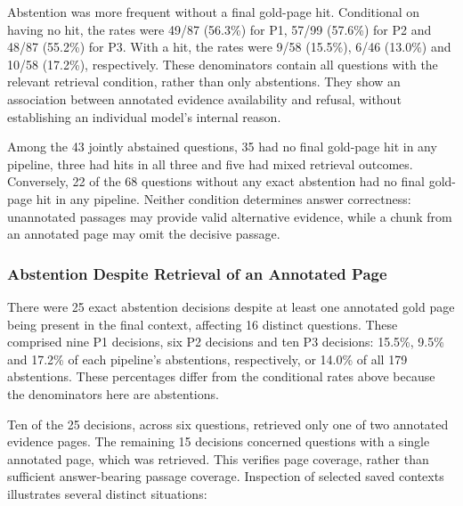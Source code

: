 Abstention was more frequent without a final gold-page hit. Conditional on
having no hit, the rates were 49/87 (56.3\%) for P1, 57/99 (57.6\%) for P2
and 48/87 (55.2\%) for P3. With a hit, the rates were 9/58 (15.5\%),
6/46 (13.0\%) and 10/58 (17.2\%), respectively. These denominators contain
all questions with the relevant retrieval condition, rather than only
abstentions. They show an association between annotated evidence availability
and refusal, without establishing an individual model's internal reason.

Among the 43 jointly abstained questions, 35 had no final gold-page hit in
any pipeline, three had hits in all three and five had mixed retrieval
outcomes. Conversely, 22 of the 68 questions without any exact abstention
had no final gold-page hit in any pipeline. Neither condition determines
answer correctness: unannotated passages may provide valid alternative
evidence, while a chunk from an annotated page may omit the decisive passage.

\subsubsection{Abstention Despite Retrieval of an Annotated Page}
There were 25 exact abstention decisions despite at least one annotated
gold page being present in the final context, affecting 16 distinct questions.
These comprised nine P1 decisions, six P2 decisions and ten P3 decisions:
15.5\%, 9.5\% and 17.2\% of each pipeline's abstentions, respectively,
or 14.0\% of all 179 abstentions. These percentages differ from the
conditional rates above because the denominators here are abstentions.

Ten of the 25 decisions, across six questions, retrieved only one of two
annotated evidence pages. The remaining 15 decisions concerned questions
with a single annotated page, which was retrieved. This verifies page
coverage, rather than sufficient answer-bearing passage coverage. Inspection
of selected saved contexts illustrates several distinct situations:


